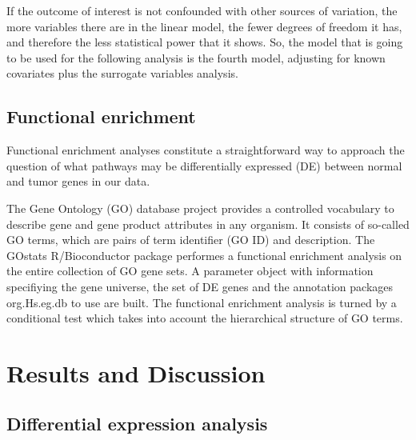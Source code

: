 \documentclass[9pt,twocolumn,twoside]{gsajnl}
\begin{document}
If the outcome of interest is not confounded with other sources of variation, the more variables there are in the linear model, the fewer degrees of freedom it has, and therefore the less statistical power that it shows. So, the model that is going to be used for the following analysis is the fourth model, adjusting for known covariates plus the surrogate variables analysis.


\subsection*{Functional enrichment}

Functional enrichment analyses constitute a straightforward way to approach the question of what pathways may be differentially expressed (DE) between normal and tumor genes in our data.

The Gene Ontology (GO) database project provides a controlled vocabulary to describe gene and gene product attributes in any organism. It consists of so-called GO terms, which are pairs of term identifier (GO ID) and description. The GOstats \citep{Falcon2007} R/Bioconductor package performes a functional enrichment analysis on the entire collection of GO gene sets. A parameter object with information specifiying the gene universe, the set of DE genes and the annotation packages org.Hs.eg.db \citep{org.Hs.eg.db} to use are built. The functional enrichment analysis is turned by a conditional test which takes into account the hierarchical structure of GO terms.


\section*{Results and Discussion}

\subsection{Differential expression analysis}
\end{document}
